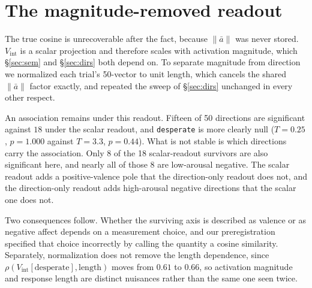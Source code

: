 \section{The magnitude-removed readout}
\label{app:readout}

The true cosine is unrecoverable after the fact, because $\lVert \bar a \rVert$ was never
stored. $V_{\text{int}}$ is a scalar projection and therefore scales with activation
magnitude, which \S\ref{sec:sem} and \S\ref{sec:dirs} both depend on. To separate
magnitude from direction we normalized each trial's 50-vector to unit length, which
cancels the shared $\lVert \bar a \rVert$ factor exactly, and repeated the sweep of
\S\ref{sec:dirs} unchanged in every other respect.

An association remains under this readout. Fifteen of 50 directions are significant
against $18$ under the scalar readout, and \texttt{desperate} is more clearly null
($T = 0.25$, $p = 1.000$ against $T = 3.3$, $p = 0.44$). What is not stable
is which directions carry the association. Only 8 of the 18 scalar-readout survivors
are also significant here, and nearly all of those 8 are low-arousal negative. The
scalar readout adds a positive-valence pole that the direction-only readout does not,
and the direction-only readout adds high-arousal negative directions that the scalar
one does not.

Two consequences follow. Whether the surviving axis is described as valence or as
negative affect depends on a measurement choice, and our preregistration specified
that choice incorrectly by calling the quantity a cosine similarity. Separately,
normalization does not remove the length dependence, since
$\rho(V_{\text{int}}[\text{desperate}], \text{length})$ moves from $0.61$ to $0.66$,
so activation magnitude and response length are distinct nuisances rather than the
same one seen twice.
